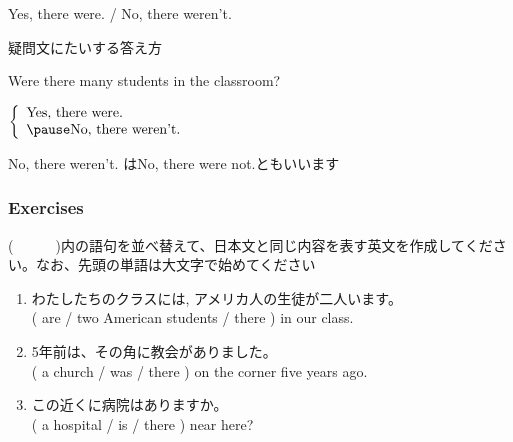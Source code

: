 \documentclass[aspectratio=169,xcolor={dvipsnames,table}]{beamer}
\newcommand{\myaudio}[1]{\href{#1}{\faVolumeUp}}
\begin{document}
 \begin{frame}[plain]{Yes, there were. / No, there weren't.}
 \Large

疑問文にたいする答え方\hfill\myaudio{./audio/001_there_is_12.mp3}
\vspace{10pt}

\pause

Were there many students in the classroom?

\pause

$\left\{\begin{array}{l}
	 \text{Yes, there were.}\\\pause
         \text{No, there weren't.}
	\end{array}\right.$

\pause

\mbox{}\hfill{}{\small No, there weren't. はNo, there were not.ともいいます}
\end{frame}
\begin{frame}[plain]\frametitle{Exercises}
(~~~~~~)内の語句を並べ替えて、日本文と同じ内容を表す英文を作成してください。なお、先頭の単語は大文字で始めてください

  \begin{enumerate}
   \item わたしたちのクラスには,
アメリカ人の生徒が二人います。\\
         ( are / two American students / there ) in our class.\\
            \item 5年前は、その角に教会がありました。\\
         ( a church / was / there ) on the corner five years ago.\\
            \item この近くに病院はありますか。\\
         ( a hospital / is / there ) near here?\\
  \end{enumerate}
\hfill\myaudio{./audio/001_there_is_13.mp3}
\end{frame}
\end{document}
